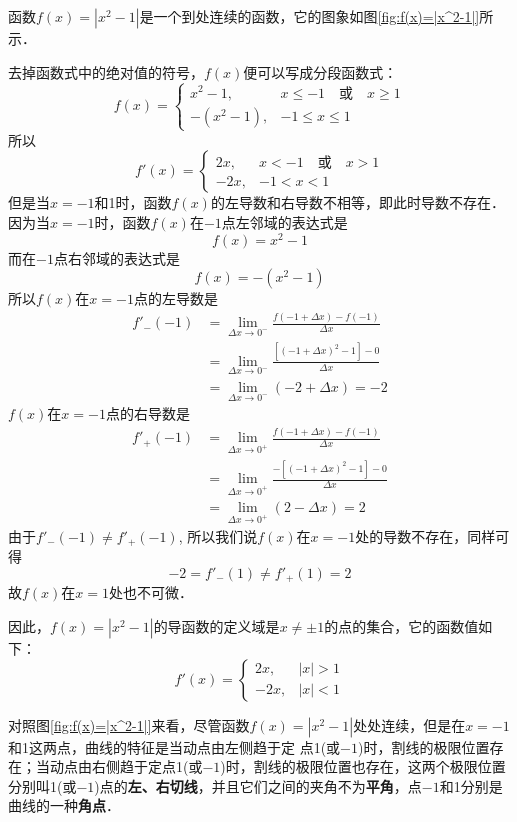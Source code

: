 \begin{solution}
函数$f(x)=|x^2-1|$是一个到处连续的函数，它的图象如图\ref{fig:f(x)=|x^2-1|}所示．

去掉函数式中的绝对值的符号，$f(x)$便可以写成分段函数式：
\[f(x)=\begin{cases}
    x^2-1,& x\le -1\quad \text{或}\quad x\ge 1\\
    -(x^2-1), & -1\le x\le 1
\end{cases}\]
所以
\[f'(x)=\begin{cases}
    2x ,&  x< -1\quad \text{或}\quad x> 1\\
    -2x,& -1<x<1
\end{cases}\]
但是当$x=-1$和1时，函数$f(x)$的左导数和右导数不相等，即此时导数不存在．因为当$x=-1$时，函数$f(x)$在$-1$点左邻域的表达式是
\[f (x) =x^2-1\]
而在$-1$点右邻域的表达式是
\[f (x) =- (x^2-1)\]
所以$f(x)$在$x=-1$点的左导数是
\begin{align*}
    f'_-(-1)&=\lim_{\Delta x\to 0^-}\frac{f(-1+\Delta x)-f(-1)}{\Delta x}\\
    &=\lim_{\Delta x\to 0^-}\frac{[(-1+\Delta x)^2-1]-0}{\Delta x}\\
    &=\lim_{\Delta x\to 0^-}(-2+\Delta x)=-2
\end{align*}
$f(x)$在$x=-1$点的右导数是
\begin{align*}
    f'_+(-1)&=\lim_{\Delta x\to 0^+}\frac{f(-1+\Delta x)-f(-1)}{\Delta x}\\
    &=\lim_{\Delta x\to 0^+}\frac{-[(-1+\Delta x)^2-1]-0}{\Delta x}\\
    &=\lim_{\Delta x\to 0^+}(2-\Delta x)=2 
\end{align*}
由于$f'_-(-1)\ne f'_+(-1)$, 所以我们说$f(x)$在$x=-1$处的导数不存在，同样可得
\[-2=f'_- (1)\ne f'_+(1)=2\]
故$f(x)$在$x=1$处也不可微．

因此，$f(x)=|x^2-1|$的导函数的定义域是$x\ne\pm 1$的点的集合，它的函数值如下：
\[f'(x)=\begin{cases}
    2x,& |x|>1\\
    -2x,& |x|<1
\end{cases}\]
\end{solution}

对照图\ref{fig:f(x)=|x^2-1|}来看，尽管函数$f(x)=|x^2-1|$处处连续，但是在$x=-1$和1这两点，曲线的特征是当动点由左侧趋于定
点1(或$-1$)时，割线的极限位置存在；当动点由右侧趋于定点1(或$-1$)时，割线的极限位置也存在，这两个极限位置分别叫1(或$-1$)点的\textbf{左、右切线}，并且它们之间的夹角不为\textbf{平角}，点$-1$和1分别是曲线的一种\textbf{角点}．
    
